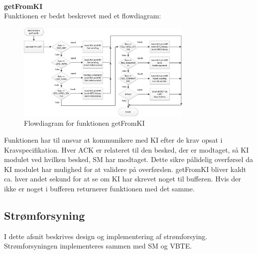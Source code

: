 \\
\textbf{getFromKI}\\
Funktionen er bedst beskrevet med et flowdiagram:
\begin{figure}[H]
	\centering
	\includegraphics[width=0.75\textwidth]{billeder/getFromKIflowchart}
	\caption{Flowdiagram for funktionen getFromKI}
	\label{fig:gFKIfc}
\end{figure}
Funktionen har til ansvar at kommunikere med KI efter de krav opsat i Kravspecifikation. Hver ACK er relateret til den besked, der er modtaget, så KI modulet ved hvilken besked, SM har modtaget. Dette sikre pålidelig overførsel da KI modulet har mulighed for at validere på overførslen. getFromKI bliver kaldt ca. hver andet sekund for at se om KI har skrevet noget til bufferen. Hvis der ikke er noget i bufferen returnerer funktionen med det samme.\\
\subsection{Strømforsyning}
I dette afsnit beskrives design og implementering af strømforsying. Strømforsyningen implementeres sammen med SM og VBTE.
